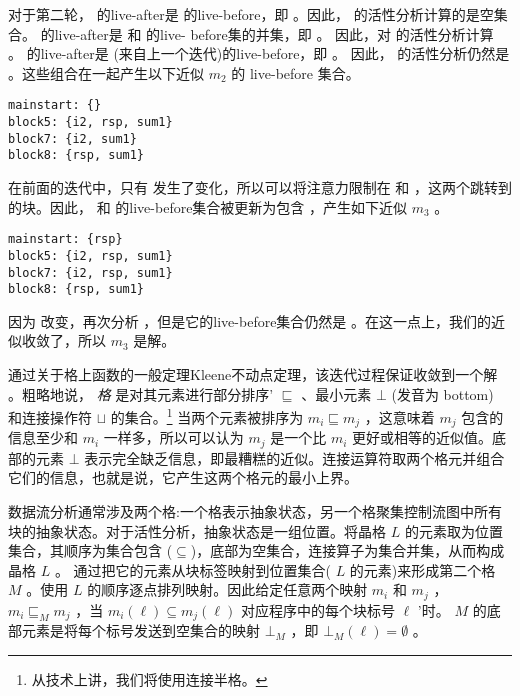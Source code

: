 \documentclass[11pt]{book}
\begin{document}
对于第二轮，  的live-after是  的live-before，即  。因此，  的活性分析计算的是空集合。  的live-after是
 和  的live- before集的并集，即 。
因此，对  的活性分析计算  。  的live-after是
 (来自上一个迭代)的live-before，即 。
因此，  的活性分析仍然是  。这些组合在一起产生以下近似 $m_2$ 的 live-before 集合。
\begin{center}
  \begin{lstlisting}
mainstart: {}
block5: {i2, rsp, sum1}
block7: {i2, sum1}
block8: {rsp, sum1}
\end{lstlisting}
\end{center}
在前面的迭代中，只有  发生了变化，所以可以将注意力限制在  和 ，这两个跳转到  的块。因此，  和  的live-before集合被更新为包含
 ，产生如下近似 $m_3$ 。
\begin{center}
  \begin{lstlisting}
mainstart: {rsp}
block5: {i2, rsp, sum1}
block7: {i2, rsp, sum1}
block8: {rsp, sum1}
\end{lstlisting}
\end{center}
因为  改变，再次分析  ，但是它的live-before集合仍然是  。在这一点上，我们的近似收敛了，所以 $m_3$ 是解。

通过关于格上函数的一般定理Kleene不动点定理，该迭代过程保证收敛到一个解~\citep{Kleene:1952aa} 。粗略地说， \emph{格} 是对其元素进行部分排序' $\sqsubseteq$ 、最小元素 $\bot$ (发音为 bottom) 和连接操作符 $\sqcup$ 的集合。\footnote{从技术上讲，我们将使用连接半格。} 当两个元素被排序为 $m_i
\sqsubseteq m_j$ ，这意味着 $m_j$ 包含的信息至少和 $m_i$ 一样多，所以可以认为 $m_j$ 是一个比 $m_i$ 更好或相等的近似值。底部的元素 $\bot$ 表示完全缺乏信息，即最糟糕的近似。连接运算符取两个格元并组合它们的信息，也就是说，它产生这两个格元的最小上界。

数据流分析通常涉及两个格:一个格表示抽象状态，另一个格聚集控制流图中所有块的抽象状态。对于活性分析，抽象状态是一组位置。将晶格 $L$ 的元素取为位置集合，其顺序为集合包含 ($\subseteq$)，底部为空集合，连接算子为集合并集，从而构成晶格 $L$ 。
%
通过把它的元素从块标签映射到位置集合( $L$ 的元素)来形成第二个格 $M$ 。使用 $L$ 的顺序逐点排列映射。因此给定任意两个映射 $m_i$ 和 $m_j$ ， $m_i \sqsubseteq_M m_j$ ，当 $m_i(\ell)
\subseteq m_j(\ell)$ 对应程序中的每个块标号 $\ell$ '时。 $M$ 的底部元素是将每个标号发送到空集合的映射 $\bot_M$ ，即 $\bot_M(\ell) = \emptyset$ 。
\end{document}
